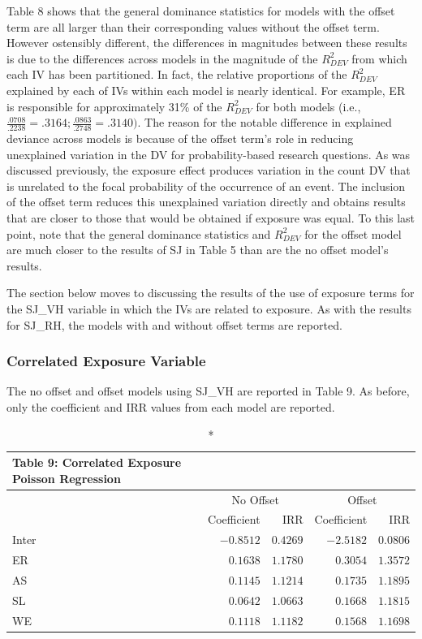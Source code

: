 \documentclass[ShortAfour,times,sageapa]{sagej}
\begin{document}
	Table 8 shows that the general dominance statistics for models with the offset term are all larger than their corresponding values without the offset term. 
	However ostensibly different, the differences in magnitudes between these results is due to the differences across models in the magnitude of the $R^2_{DEV}$ from which each IV has been partitioned.
	In fact, the relative proportions of the $R^2_{DEV}$ explained by each of IVs within each model is nearly identical.
	For example, ER is responsible for approximately 31\% of the $R^2_{DEV}$ for both models (i.e., $\frac{.0708}{.2238} = .3164; \frac{.0863}{.2748} = .3140)$.
	The reason for the notable difference in explained deviance across models is because of the offset term's role in reducing unexplained variation in the DV for probability-based research questions.
	As was discussed previously, the exposure effect produces variation in the count DV that is unrelated to the focal probability of the occurrence of an event.
	The inclusion of the offset term reduces this unexplained variation directly and obtains results that are closer to those that would be obtained if exposure was equal.
	To this last point, note that the general dominance statistics and $R^2_{DEV}$ for the offset model are much closer to the results of SJ in Table 5 than are the no offset model's results.
	
	The section below moves to discussing the results of the use of exposure terms for the SJ\_VH variable in which the IVs are related to exposure.
	As with the results for SJ\_RH, the models with and without offset terms are reported.
	
		\subsubsection{Correlated Exposure Variable}
		
	The no offset and offset models using SJ\_VH are reported in Table 9.
	As before, only the coefficient and IRR values from each model are reported.
	
	\begin{longtable}{l|rrrr}
		\caption*{
			{\large Table 9: Correlated Exposure Poisson Regression}
		} \\ 
		\toprule
		\multicolumn{1}{l}{} & \multicolumn{2}{c}{No Offset} & \multicolumn{2}{c}{Offset} \\ 
		\cmidrule(lr){2-3} \cmidrule(lr){4-5}
		\multicolumn{1}{l}{} & Coefficient & IRR & Coefficient & IRR \\ 
		\midrule
		Inter & $-0.8512$ & $0.4269$ & $-2.5182$ & $0.0806$ \\ 
		ER & $0.1638$ & $1.1780$ & $0.3054$ & $1.3572$ \\ 
		AS & $0.1145$ & $1.1214$ & $0.1735$ & $1.1895$ \\ 
		SL & $0.0642$ & $1.0663$ & $0.1668$ & $1.1815$ \\ 
		WE & $0.1118$ & $1.1182$ & $0.1568$ & $1.1698$ \\ 
		\bottomrule
	\end{longtable}
	
\end{document}
